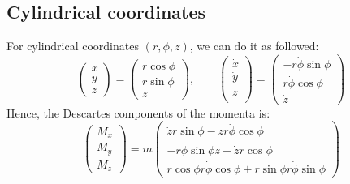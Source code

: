 \subsection{Cylindrical coordinates}
For cylindrical coordinates $(r,\phi,z)$, we can do it as followed: 
\begin{equation}
    \begin{pmatrix}
        x \\
        y \\
        z
    \end{pmatrix}
    = 
    \begin{pmatrix}
        r\cos{\phi}\\
        r\sin{\phi}\\
        z
    \end{pmatrix}
    , \quad \quad 
    \begin{pmatrix}
        \dot{x} \\
        \dot{y} \\
        \dot{z} \\
    \end{pmatrix}
    = 
    \begin{pmatrix}
        -r\dot{\phi}\sin{\phi} \\
        r\dot{\phi}\cos{\phi} \\
        \dot{z}
    \end{pmatrix}
\end{equation}
Hence, the Descartes components of the momenta is: 
\begin{equation}
    \begin{pmatrix}
        M_{x} \\
        M_{y} \\
        M_{z} 
    \end{pmatrix}
    = 
    m\begin{pmatrix}
         \dot{z}r\sin{\phi} - zr\dot{\phi}\cos{\phi} \\
         -r\dot{\phi}\sin{\phi}z - \dot{z}r\cos{\phi} \\
         r\cos{\phi} r\dot{\phi}\cos{\phi} + r\sin{\phi}r\dot{\phi}\sin{\phi}
    \end{pmatrix}
\end{equation}
